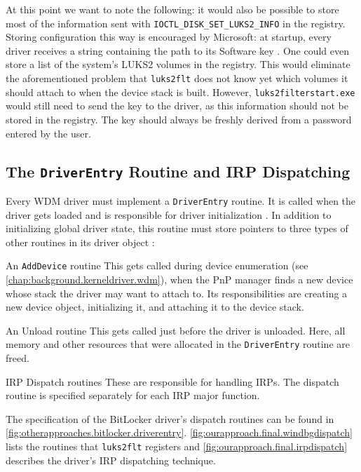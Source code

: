 At this point we want to note the following: it would also be possible to store most of the information sent with \texttt{IOCTL\_DISK\_SET\_LUKS2\_INFO} in the registry. Storing configuration this way is encouraged by Microsoft: at startup, every driver receives a string containing the path to its Software key \cite{Wdk}. One could even store a list of the system's LUKS2 volumes in the registry. This would eliminate the aforementioned problem that \texttt{luks2flt} does not know yet which volumes it should attach to when the device stack is built. However, \texttt{luks2filterstart.exe} would still need to send the key to the driver, as this information should not be stored in the registry. The key should always be freshly derived from a password entered by the user.

\subsection{The \texttt{DriverEntry} Routine and IRP Dispatching}
\label{chap:ourapproach.final.genericdispatch}
Every WDM driver must implement a \texttt{DriverEntry} routine. It is called when the driver gets loaded and is responsible for driver initialization \cite{Wdk}. In addition to initializing global driver state, this routine must store pointers to three types of other routines in its driver object \cite{Kerneldriver}:
\begin{descitemize}
	\item[An \texttt{AddDevice} routine] This gets called during device enumeration (see \autoref{chap:background.kerneldriver.wdm}), when the PnP manager finds a new device whose stack the driver may want to attach to. Its responsibilities are creating a new device object, initializing it, and attaching it to the device stack.
	\item[An Unload routine] This gets called just before the driver is unloaded. Here, all memory and other resources that were allocated in the \texttt{DriverEntry} routine are freed.
	\item[IRP Dispatch routines] These are responsible for handling IRPs. The dispatch routine is specified separately for each IRP major function.
\end{descitemize}

The specification of the BitLocker driver's dispatch routines can be found in \autoref{fig:otherapproaches.bitlocker.driverentry}. \autoref{fig:ourapproach.final.windbgdispatch} lists the routines that \texttt{luks2flt} registers and \autoref{fig:ourapproach.final.irpdispatch} describes the driver's IRP dispatching technique.

